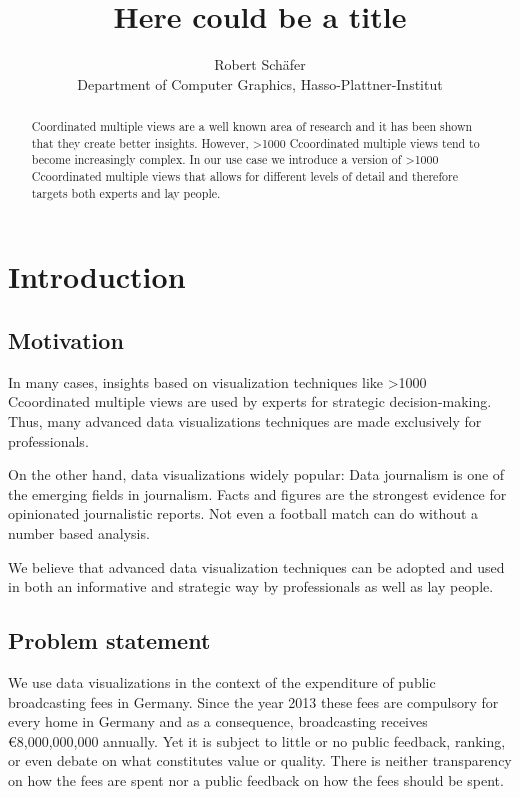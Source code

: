 \documentclass{article}
\begin{document}
\title{Here could be a title}\label{here-could-be-a-title}
\author{Robert Schäfer\\ Department of Computer Graphics, Hasso-Plattner-Institut}
\maketitle

\newcommand{\rufu}{Rundfunk \textsc{mitbestimmen}}
\newcommand\hmm[1]{\ifnum\ifhmode\spacefactor\else2000\fi>1000 \uppercase{#1}\else#1\fi}
\newcommand{\cmv}{\hmm{c}oordinated multiple view}
\newcommand{\cmvs}{\hmm{c}oordinated multiple views}

\begin{abstract}
Coordinated multiple views are a well known area of research and it has
been shown that they create better insights.
However, \cmvs{} tend to become increasingly complex.
In our use case we introduce a version of \cmvs{} that allows for different levels of detail and therefore targets both experts and lay people.
\end{abstract}

\section{Introduction}

\subsection{Motivation}

In many cases, insights based on visualization techniques like \cmvs{} are used by experts for strategic decision-making.
Thus, many advanced data visualizations techniques are made exclusively for professionals.

On the other hand, data visualizations widely popular:
Data journalism is one of the emerging fields in journalism.
Facts and figures are the strongest evidence for opinionated journalistic reports.
Not even a football match can do without a number based analysis.

We believe that advanced data visualization techniques can be adopted and used in both an informative and strategic way by professionals as well as lay people.

\subsection{Problem statement}

We use data visualizations in the context of the expenditure of public broadcasting fees in Germany.
Since the year 2013 these fees are compulsory for every home in Germany and as a consequence, broadcasting receives €8,000,000,000 annually.
Yet it is subject to little or no public feedback, ranking, or even debate on what constitutes value or quality.
There is neither transparency on how the fees are spent nor a public feedback on how the fees should be spent.
\end{document}
